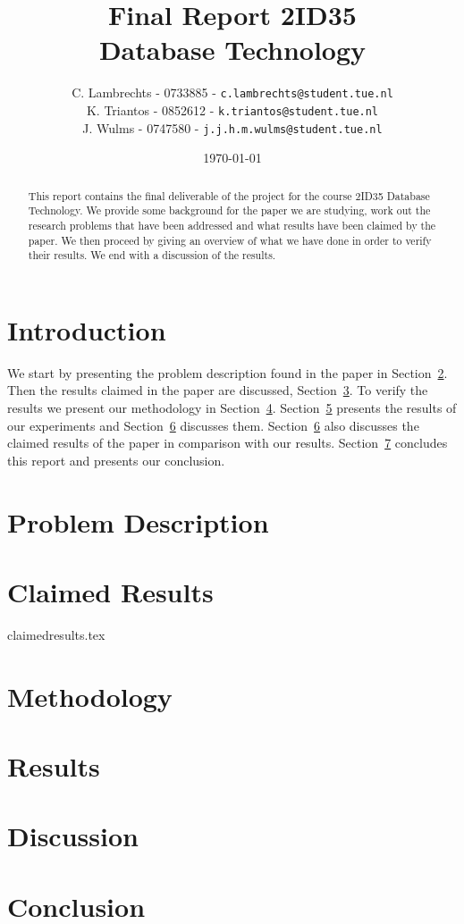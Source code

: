 \documentclass[a4paper,twoside,11pt]{article}
\title{\vspace{-\baselineskip}\sffamily\bfseries Final Report 2ID35 \\ Database Technology }
\author{
C. Lambrechts - 0733885 - {\tt c.lambrechts@student.tue.nl} \\
K. Triantos - 0852612 - {\tt k.triantos@student.tue.nl}\\
J. Wulms - 0747580 - {\tt j.j.h.m.wulms@student.tue.nl}\\
}
\date{\today}
\numberwithin{equation}{section}
\begin{document}
\maketitle
\thispagestyle{empty}
\begin{abstract}
This report contains the final deliverable of the project for the course 2ID35 Database Technology. We provide some background for the paper we are studying, work out the research problems that have been addressed and what results have been claimed by the paper. We then proceed by giving an overview of what we have done in order to verify their results. We end with a discussion of the results.
\end{abstract}

\section{Introduction} \label{sec:Introduction}

We start by presenting the problem description found in the paper in Section~\ref{sec:ProblemDescription}. Then the results claimed in the paper are discussed, Section~\ref{sec:ClaimedResults}. To verify the results we present our methodology in Section~\ref{sec:Methodology}. Section~\ref{sec:Results} presents the results of our experiments and Section~\ref{sec:Discussion} discusses them. Section~\ref{sec:Discussion} also discusses the claimed results of the paper \cite{paper} in comparison with our results. Section~\ref{sec:Conclusion} concludes this report and presents our conclusion. 

\section{Problem Description} \label{sec:ProblemDescription}


\section{Claimed Results} \label{sec:ClaimedResults}
 {claimedresults.tex}

\section{Methodology} \label{sec:Methodology}


\section{Results} \label{sec:Results}

\section{Discussion} \label{sec:Discussion}


\section{Conclusion} \label{sec:Conclusion}


%


\end{document}
